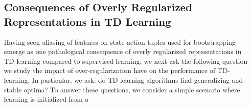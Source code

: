 
\subsection{Consequences of Overly Regularized Representations in TD Learning}
Having seen aliasing of features on state-action tuples used for bootstrapping emerge as one pathological consequence of overly regularized representations in TD-learning compared to supervised learning, we next ask the following question we study the impact of over-regularization have on the performance of TD-learning. In particular, we ask: do TD-learning algorithms find generalizing and stable optima? To answer these questions, we consider a simple scenario where learning is initialized from a 


